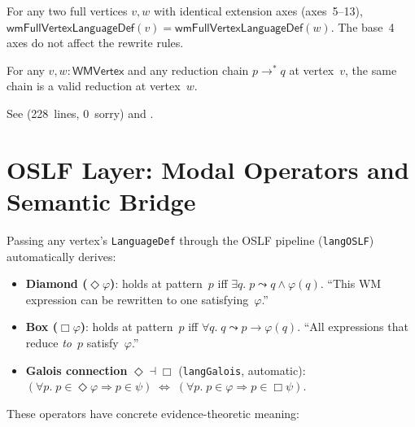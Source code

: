 \documentclass[11pt,openany]{report}
\begin{document}
\begin{theorem}
For any two full vertices $v, w$ with identical extension axes (axes~5--13),
$\mathsf{wmFullVertexLanguageDef}(v) = \mathsf{wmFullVertexLanguageDef}(w)$.
The base~4 axes do not affect the rewrite rules.
\end{theorem}

\begin{theorem}
For any $v, w : \mathsf{WMVertex}$ and any reduction chain
$p \to^* q$ at vertex~$v$, the same chain is a valid reduction at
vertex~$w$.
\end{theorem}

\noindent
See 
(228~lines, 0~sorry) and
.

\section{OSLF Layer: Modal Operators and Semantic Bridge}
\label{sec:wm-oslf-layer}
\label{sec:wm-oslf}
\label{sec:wm-gslt-bridge}

Passing any vertex's \texttt{LanguageDef} through the OSLF pipeline
(\texttt{langOSLF}) automatically derives:

\begin{itemize}
\item \textbf{Diamond ($\Diamond\varphi$)}: holds at pattern~$p$ iff
  $\exists q.\; p \leadsto q \wedge \varphi(q)$.
  ``This WM expression can be rewritten to one satisfying~$\varphi$.''

\item \textbf{Box ($\Box\varphi$)}: holds at pattern~$p$ iff
  $\forall q.\; q \leadsto p \to \varphi(q)$.
  ``All expressions that reduce \emph{to}~$p$ satisfy~$\varphi$.''

\item \textbf{Galois connection} $\Diamond \dashv \Box$
  (\texttt{langGalois}, automatic):
  $(\forall p.\; p \in \Diamond\varphi \Rightarrow p \in \psi)
  \;\Leftrightarrow\;
  (\forall p.\; p \in \varphi \Rightarrow p \in \Box\psi)$.
\end{itemize}

These operators have concrete evidence-theoretic meaning:
\end{document}
